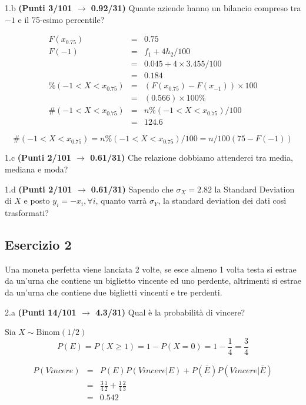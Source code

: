 \documentclass[
  11pt,
]{book}
\theoremstyle{mytheoremstyle}
\theoremstyle{mydefstyle}
\newenvironment{sol}
  {
  \begin{tcolorbox}[enhanced,breakable,arc=0.1mm,boxrule=1pt,colback=white,colframe=iblue,
  title=\bf \fontfamily{lmss}\selectfont \hspace{.5 cm} Soluzione,drop fuzzy shadow]

}{
\end{tcolorbox}
  }
\begin{document}
1.b \textbf{(Punti 3/101 \(\rightarrow\) 0.92/31)} Quante aziende hanno un bilancio compreso tra \(-1\) e il 75-esimo
percentile?

\begin{sol}
\begin{eqnarray*}
  F(x_{0.75}) &=&  0.75\\
  F(-1) &=& f_1+4h_2/100\\
  &=& 0.045+4\times 3.455/100\\
  &=& 0.184\\
  \%(-1<X<x_{0.75}) &=& (F(x_{0.75})-F(x_{-1}))\times 100\\
  &=& (0.566)\times 100 \%\\
  \#(-1<X<x_{0.75}) &=& n\%(-1<X<x_{0.75})/100 \\
  &=& 124.6
\end{eqnarray*}

\[
\#(-1<X<x_{0.75})=n\%(-1<X<x_{0.75})/100=n/100(75-F(-1))
\]

\end{sol}

1.c \textbf{(Punti 2/101 \(\rightarrow\) 0.61/31)} Che relazione dobbiamo attenderci tra media, mediana e moda?

1.d \textbf{(Punti 2/101 \(\rightarrow\) 0.61/31)} Sapendo che \(\sigma_X=2.82\) la Standard Deviation di \(X\)
e posto \(y_i=-x_i, \forall i\), quanto varrà \(\sigma_Y\), la standard deviation dei dati così
trasformati?

\subsection{Esercizio 2}\label{esercizio-2-19}

Una moneta perfetta viene lanciata 2 volte, se esce almeno 1 volta testa si estrae da un'urna che contiene un biglietto vincente ed uno perdente, altrimenti si estrae da un'urna che contiene due biglietti vincenti e tre perdenti.

2.a \textbf{(Punti 14/101 \(\rightarrow\) 4.3/31)} Qual è la probabilità di vincere?

\begin{sol}
Sia \(X\sim\text{Binom}(1/2)\)
\[P(E)=P(X\ge 1)=1-P(X=0)=1-\frac 14=\frac 34\]

\begin{eqnarray*}
  P(Vincere) &=& P(E)P(Vincere|E)+P(\bar E)P(Vincere|\bar E)\\
  &=& \frac 34\frac 12 + \frac 14 \frac 23\\
  &=& 0.542
\end{eqnarray*}

\end{sol}
\end{document}
